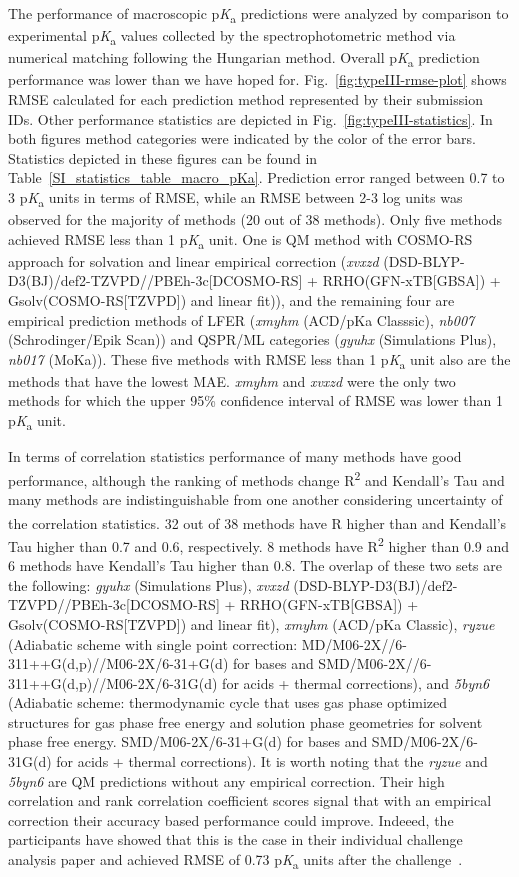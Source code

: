 \documentclass[9pt,lineno,final]{elife}
\newcommand{\pKa}{p\textit{K}\textsubscript{a}}
\begin{document}
The performance of macroscopic \pKa{} predictions were analyzed by comparison to experimental \pKa{} values collected by the spectrophotometric method via numerical matching following the Hungarian method.  
Overall \pKa{} prediction performance was lower than we have hoped for. 
Fig.~\ref{fig:typeIII-rmse-plot} shows RMSE calculated for each prediction method represented by their submission IDs. 
Other performance statistics are depicted in Fig.~\ref{fig:typeIII-statistics}.
In both figures method categories were indicated by the color of the error bars.  Statistics depicted in these figures can be found in Table~\ref{SI_statistics_table_macro_pKa}.
Prediction error ranged between 0.7 to 3 \pKa{} units in terms of RMSE, while an RMSE between 2-3 log units was observed for the majority of methods (20 out of 38 methods). 
Only five methods achieved RMSE less than 1 \pKa{} unit. One is QM method with COSMO-RS approach for solvation and linear empirical correction (\textit{xvxzd} (DSD-BLYP-D3(BJ)/def2-TZVPD//PBEh-3c[DCOSMO-RS] + RRHO(GFN-xTB[GBSA]) + Gsolv(COSMO-RS[TZVPD]) and linear fit)), and the remaining four are empirical prediction methods of LFER (\textit{xmyhm} (ACD/pKa Classsic), \textit{nb007} (Schrodinger/Epik Scan)) and QSPR/ML categories (\textit{gyuhx} (Simulations Plus), \textit{nb017} (MoKa)). 
These five methods with RMSE less than 1 \pKa{} unit also are the methods that have the lowest MAE.
\textit{xmyhm} and \textit{xvxzd} were the only two methods for which the upper 95\% confidence interval of RMSE was lower than 1 \pKa{} unit. 

In terms of correlation statistics performance of many methods have good performance, although the ranking of methods change R\textsuperscript{2} and Kendall's Tau and many methods are indistinguishable from one another considering uncertainty of the correlation statistics. 
32 out of 38 methods have R\textsuperscript{} higher than and Kendall's Tau higher than 0.7 and 0.6, respectively.
8 methods have R\textsuperscript{2} higher than 0.9 and 6 methods have Kendall's Tau higher than 0.8.
The overlap of these two sets are the following:
\textit{gyuhx} (Simulations Plus), \textit{xvxzd} (DSD-BLYP-D3(BJ)/def2-TZVPD//PBEh-3c[DCOSMO-RS] + RRHO(GFN-xTB[GBSA]) + Gsolv(COSMO-RS[TZVPD]) and linear fit), \textit{xmyhm} (ACD/pKa Classic), \textit{ryzue} (Adiabatic scheme with single point correction: MD/M06-2X//6-311++G(d,p)//M06-2X/6-31+G(d) for bases and SMD/M06-2X//6-311++G(d,p)//M06-2X/6-31G(d) for acids + thermal corrections), and \textit{5byn6} 
(Adiabatic scheme: thermodynamic cycle that uses gas phase optimized structures for gas phase free energy and solution phase geometries for solvent phase free energy. SMD/M06-2X/6-31+G(d) for bases and SMD/M06-2X/6-31G(d) for acids + thermal corrections).
It is worth noting that the \textit{ryzue} and \textit{5byn6} are QM predictions without any empirical correction. Their high correlation and rank correlation coefficient scores signal that with an empirical correction their accuracy based performance could improve. Indeeed, the participants have showed that this is the case in their individual challenge analysis paper and achieved RMSE of 0.73 \pKa{} units after the challenge~\citep{Zeng:2018:J.Comput.AidedMol.Des.}. 
\end{document}
